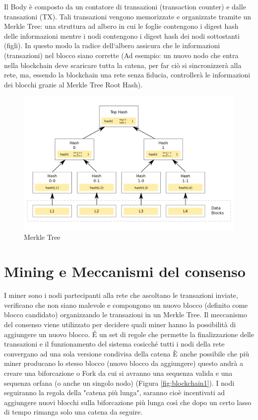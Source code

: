 \documentclass[11pt,a4paper,titlepage, twoside, openright]{report}
\begin{document}
Il Body è composto da un contatore di transazioni (transaction counter) e dalle transazioni (TX). Tali transazioni vengono memorizzate e organizzate tramite un Merkle Tree: una struttura ad albero in cui le foglie contengono i digest hash delle informazioni mentre i nodi contengono i digest hash dei nodi sottostanti (figli). In  questo modo la radice dell`albero assicura che le informazioni (transazioni) nel blocco siano corrette (Ad esempio: un nuovo nodo che entra nella blockchain deve scaricare tutta la catena, per far ciò si sincronizzerà alla rete, ma, essendo la blockchain una rete senza fiducia, controllerà le informazioni dei blocchi grazie al Merkle Tree Root Hash).
\begin{figure}[h]
	\includegraphics[width=\textwidth]{Hash_Tree}
	\centering
	\caption{Merkle Tree}
	\label{fig:Tree1}
\end{figure}

\section{Mining e Meccanismi del consenso}
I miner sono i nodi partecipanti alla rete che  ascoltano le transazioni inviate, verificano che non siano malevole e compongono un nuovo blocco (definito come blocco candidato) organizzando le transazioni in un Merkle Tree.
Il meccanismo del consenso viene utilizzato  per decidere quali miner hanno la possibilità di aggiungere un nuovo blocco.
É un set di regole che permette la finalizzazione delle transazioni e il funzionamento del sistema cosicché tutti i nodi della rete convergano ad una sola versione condivisa della catena
È anche possibile che più miner producano lo stesso blocco (nuovo blocco da aggiungere) questo andrà a creare una biforcazione o Fork da cui si avranno una sequenza valida e una sequenza orfana (o anche un singolo nodo) (Figura \ref{fig:blockchain1}). I nodi seguiranno la regola della "catena più lunga", saranno cioè incentivati ad aggiungere nuovi blocchi sulla biforcazione più lunga così che dopo un certo lasso di tempo rimanga solo una catena da seguire. 
\end{document}
